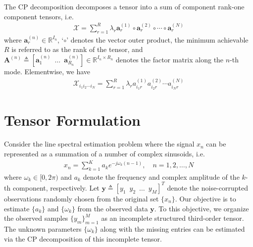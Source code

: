 \documentclass[10pt,journal,epsfig]{IEEEtran}
\begin{document}
The CP decomposition decomposes a tensor into a sum of component
rank-one component tensors, i.e.
\begin{align}
\boldsymbol{\mathcal{X}}=
\sum\limits_{r=1}^{R}\lambda_r\boldsymbol{a}_r^{(1)}\circ\boldsymbol{a}_r^{(2)}\circ\cdots\circ\boldsymbol{a}_r^{(N)}
\end{align}
where $\boldsymbol{a}_r^{(n)}\in\mathbb{R}^{I_n}$, `$\circ$'
denotes the vector outer product, the minimum achievable $R$ is
referred to as the rank of the tensor, and
$\boldsymbol{A}^{(n)}\triangleq
[\boldsymbol{a}_{1}^{(n)}\phantom{0}\ldots\phantom{0}\boldsymbol{a}_{R_n}^{(n)}]\in\mathbb{R}^{I_n\times
R_n}$ denotes the factor matrix along the $n$-th mode.
Elementwise, we have
\begin{align}
\mathcal{X}_{i_1 i_2\cdots i_N}=\sum\limits_{r=1}^{R}\lambda_r
a_{i_1 r}^{(1)}a_{i_2 r}^{(2)}\cdots a_{i_N r}^{(N)}
\end{align}





\section{Tensor Formulation}
Consider the line spectral estimation problem where the signal
$x_n$ can be represented as a summation of a number of complex
sinusoids, i.e.
\begin{align}
x_n=\sum\limits_{k=1}^{K}a_k e^{-j\omega_k (n-1)},\quad
n=1,2,\dots,N
\end{align}
where $\omega_k\in[0,2\pi)$ and $a_k$ denote the frequency and
complex amplitude of the $k$-th component, respectively. Let
$\boldsymbol{y}\triangleq [y_1 \phantom{0}y_2
\phantom{0}\dots\phantom{0} y_M]^T$ denote the noise-corrupted
observations randomly chosen from the original set $\{x_n\}$. Our
objective is to estimate $\{a_k\}$ and $\{\omega_k\}$ from the
observed data $\boldsymbol{y}$. To this objective, we organize the
observed samples $\{y_m\}_{m=1}^M$ as an incomplete structured
third-order tensor. The unknown parameters $\{\omega_k\}$ along
with the missing entries can be estimated via the CP decomposition
of this incomplete tensor.
\end{document}
